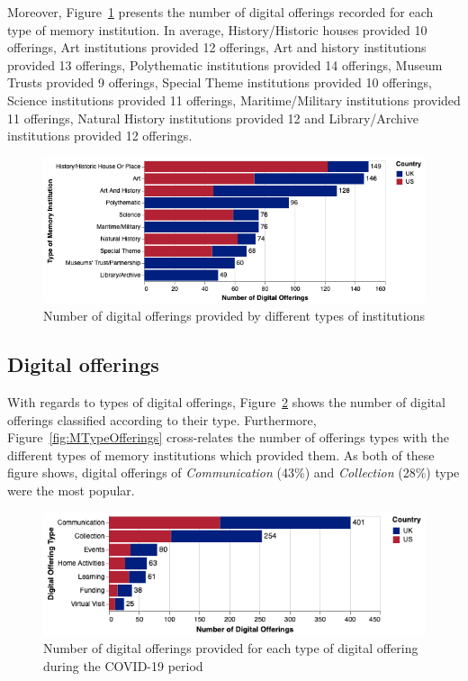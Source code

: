 \documentclass{egpubl}
\begin{document}
Moreover, Figure~\ref{fig:typeofferings} presents the number of digital offerings recorded for each type of memory institution. In average, History/Historic houses provided 10 offerings, Art institutions provided 12 offerings, Art and history institutions provided 13 offerings, Polythematic institutions provided 14 offerings, Museum Trusts provided 9 offerings, Special Theme institutions provided 10 offerings, Science institutions provided 11 offerings, Maritime/Military institutions provided 11 offerings, Natural History institutions provided 12 and Library/Archive institutions provided 12 offerings. 

\begin{figure}[h]
  \centering
  \includegraphics[width=\linewidth]{images/typesoffering.png}
  \caption{\label{fig:typeofferings}
           Number of digital offerings provided by different types of institutions}
\end{figure}




\subsection{Digital offerings}
\label{dig}
With regards to types of digital offerings, Figure~\ref{fig:DigOffType} shows the number of digital offerings classified according to their type. Furthermore, Figure~\ref{fig:MTypeOfferings} cross-relates the number of offerings types with the different types of memory institutions which provided them. As both of these figure shows, digital offerings of \emph{Communication} (43\%) and \emph{Collection} (28\%) type were the most popular. 



\begin{figure}[h]
  \centering
  \includegraphics[width=\linewidth]{images/digitalTypes.png}
  \caption{\label{fig:DigOffType}
           Number of digital offerings provided for each type of digital offering during the COVID-19 period}
\end{figure}
\end{document}
